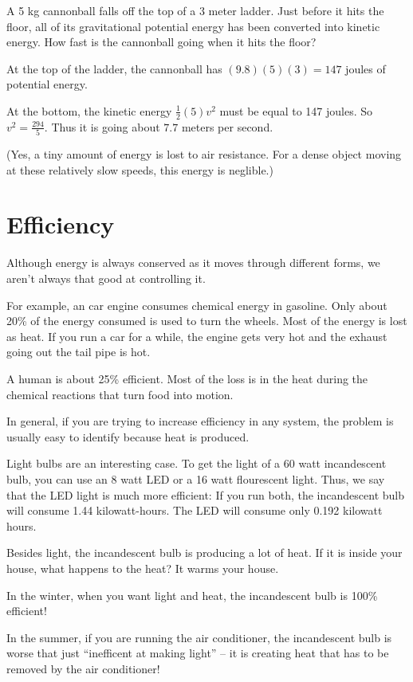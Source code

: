 \begin{Exercise}[title={The Energy of Falling}, label=energy_falling]
  
A 5 kg cannonball falls off the top of a 3 meter ladder. Just before
it hits the floor, all of its gravitational potential energy has been
converted into kinetic energy.  How fast is the cannonball going when
it hits the floor?

\end{Exercise}
\begin{Answer}[ref=energy_falling]

  At the top of the ladder, the cannonball has $(9.8)(5)(3) = 147$ joules of potential energy.

  At the bottom, the kinetic energy $\frac{1}{2}(5)v^2$ must be equal
  to 147 joules. So $v^2 = \frac{294}{5}$.  Thus it is going about
  $7.7$ meters per second.

  (Yes, a tiny amount of energy is lost to air resistance. For a dense
  object moving at these relatively slow speeds, this energy is
  neglible.)
  
\end{Answer}


\section{Efficiency}

Although energy is always conserved as it moves through different
forms, we aren't always that good at controlling it.

For example, an car engine consumes chemical energy in gasoline. Only
about 20\% of the energy consumed is used to turn the wheels.  Most of
the energy is lost as heat. If you run a car for a while, the engine
gets very hot and the exhaust going out the tail pipe is hot.

A human is about 25\% efficient. Most of the loss is in the heat
during the chemical reactions that turn food into motion.

In general, if you are trying to increase efficiency in any system,
the problem is usually easy to identify because heat is produced.

Light bulbs are an interesting case. To get the light of a 60 watt
incandescent bulb, you can use an 8 watt LED or a 16 watt flourescent
light. Thus, we say that the LED light is much more efficient: If you
run both, the incandescent bulb will consume 1.44 kilowatt-hours. The
LED will consume only 0.192 kilowatt hours.

Besides light, the incandescent bulb is producing a lot of heat. If it
is inside your house, what happens to the heat? It warms your house.

In the winter, when you want light and heat, the incandescent bulb is
100\% efficient!

In the summer, if you are running the air conditioner, the
incandescent bulb is worse that just ``inefficent at making light'' --
it is creating heat that has to be removed by the air conditioner! 
